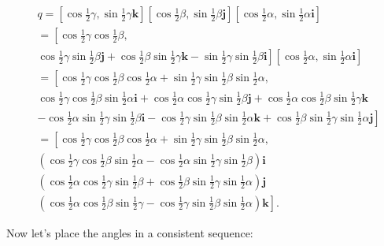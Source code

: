 $$
\begin{aligned}
& q=\left[\cos \frac{1}{2} \gamma, \sin \frac{1}{2} \gamma \mathbf{k}\right]\left[\cos \frac{1}{2} \beta, \sin \frac{1}{2} \beta \mathbf{j}\right]\left[\cos \frac{1}{2} \alpha, \sin \frac{1}{2} \alpha \mathbf{i}\right] \\
& =\left[\cos \frac{1}{2} \gamma \cos \frac{1}{2} \beta,\right. \\
& \left.\cos \frac{1}{2} \gamma \sin \frac{1}{2} \beta \mathbf{j}+\cos \frac{1}{2} \beta \sin \frac{1}{2} \gamma \mathbf{k}-\sin \frac{1}{2} \gamma \sin \frac{1}{2} \beta \mathbf{i}\right]\left[\cos \frac{1}{2} \alpha, \sin \frac{1}{2} \alpha \mathbf{i}\right] \\
& =\left[\cos \frac{1}{2} \gamma \cos \frac{1}{2} \beta \cos \frac{1}{2} \alpha+\sin \frac{1}{2} \gamma \sin \frac{1}{2} \beta \sin \frac{1}{2} \alpha\right. \text {, } \\
& \cos \frac{1}{2} \gamma \cos \frac{1}{2} \beta \sin \frac{1}{2} \alpha \mathbf{i}+\cos \frac{1}{2} \alpha \cos \frac{1}{2} \gamma \sin \frac{1}{2} \beta \mathbf{j}+\cos \frac{1}{2} \alpha \cos \frac{1}{2} \beta \sin \frac{1}{2} \gamma \mathbf{k} \\
& \left.-\cos \frac{1}{2} \alpha \sin \frac{1}{2} \gamma \sin \frac{1}{2} \beta \mathbf{i}-\cos \frac{1}{2} \gamma \sin \frac{1}{2} \beta \sin \frac{1}{2} \alpha \mathbf{k}+\cos \frac{1}{2} \beta \sin \frac{1}{2} \gamma \sin \frac{1}{2} \alpha \mathbf{j}\right] \\
& =\left[\cos \frac{1}{2} \gamma \cos \frac{1}{2} \beta \cos \frac{1}{2} \alpha+\sin \frac{1}{2} \gamma \sin \frac{1}{2} \beta \sin \frac{1}{2} \alpha\right. \text {, } \\
& \left(\cos \frac{1}{2} \gamma \cos \frac{1}{2} \beta \sin \frac{1}{2} \alpha-\cos \frac{1}{2} \alpha \sin \frac{1}{2} \gamma \sin \frac{1}{2} \beta\right) \mathbf{i} \\
& \left(\cos \frac{1}{2} \alpha \cos \frac{1}{2} \gamma \sin \frac{1}{2} \beta+\cos \frac{1}{2} \beta \sin \frac{1}{2} \gamma \sin \frac{1}{2} \alpha\right) \mathbf{j} \\
& \left.\left(\cos \frac{1}{2} \alpha \cos \frac{1}{2} \beta \sin \frac{1}{2} \gamma-\cos \frac{1}{2} \gamma \sin \frac{1}{2} \beta \sin \frac{1}{2} \alpha\right) \mathbf{k}\right] \text {. }
\end{aligned}
$$

Now let's place the angles in a consistent sequence:

